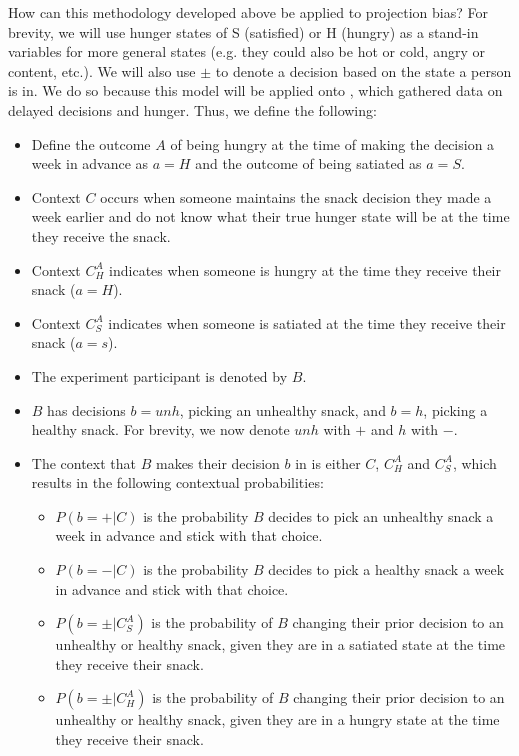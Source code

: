 \documentclass[12pt]{article}
\begin{document}
	 
	 How can this methodology developed above be applied to projection bias? For brevity, we will use hunger states of S (satisfied) or H (hungry) as a stand-in variables for more general states (e.g. they could also be hot or cold, angry or content, etc.). We will also use $\pm$ to denote a decision based on the state a person is in.  We do so because this model will be applied onto \cite{read_leeuwen_1998}, which gathered data on delayed decisions and hunger.  Thus, we define the following:
	 \begin{itemize}
	 	\item Define the outcome $A$ of being hungry at the time of making the decision a week in advance as $a=H$ and the outcome of being satiated as $a=S$.
	 	\item Context $C$ occurs when someone maintains the snack decision they made a week earlier and do not know what their true hunger state will be at the time they receive the snack.
	 	\item Context $C_{H}^A$ indicates when someone is hungry at the time they receive their snack ($a=H$).
	 	\item Context $C_S^A$ indicates when someone is satiated at the time they receive their snack ($a=s$).
	 	\item The experiment participant is denoted by $B$. 
	 	\item $B$ has decisions $b=unh$, picking an unhealthy snack, and $b=h$, picking a healthy snack. For brevity, we now denote $unh$ with $+$ and $h$ with $-$.
	 	\item The context that $B$ makes their decision $b$ in is either $C$, $C_{H}^A$ and $C_S^A$, which results in the following contextual probabilities:
	 	\begin{itemize}
	 	\item $P(b=+|C)$ is the probability $B$ decides to pick an unhealthy snack a week in advance and stick with that choice.
	 	\item $P(b=-|C)$ is the probability $B$ decides to pick a healthy snack a week in advance and stick with that choice. 
	 	\item $P(b=\pm|C_S^A)$ is the probability of $B$ changing their prior decision to an unhealthy or healthy snack, given they are in a satiated state at the time they receive their snack.
	 	\item $P(b=\pm|C_H^A)$ is the probability of $B$ changing their prior decision to an unhealthy or healthy snack, given they are in a hungry state at the time they receive their snack.
	 \end{itemize}
	 \end{itemize}
	 	 
\end{document}
